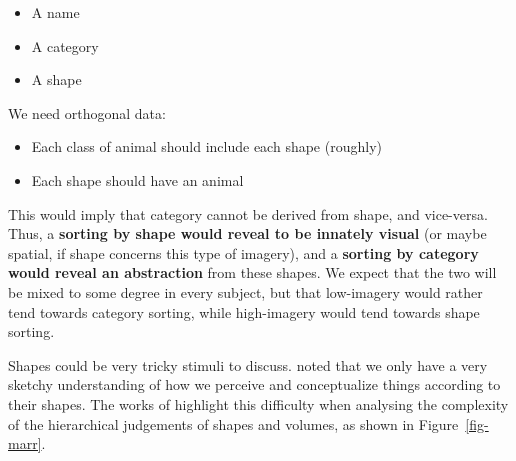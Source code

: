 \documentclass[
  authoryear]{elsarticle}
\begin{document}
\begin{itemize}
\item
  A name
\item
  A category
\item
  A shape
\end{itemize}

We need orthogonal data:

\begin{itemize}
\item
  Each class of animal should include each shape (roughly)
\item
  Each shape should have an animal
\end{itemize}

This would imply that category cannot be derived from shape, and
vice-versa. Thus, a \textbf{sorting by shape would reveal to be innately
visual} (or maybe spatial, if shape concerns this type of imagery), and
a \textbf{sorting by category would reveal an abstraction} from these
shapes. We expect that the two will be mixed to some degree in every
subject, but that low-imagery would rather tend towards category
sorting, while high-imagery would tend towards shape sorting.

Shapes could be very tricky stimuli to discuss. \citet{gardenfors2004}
noted that we only have a very sketchy understanding of how we perceive
and conceptualize things according to their shapes. The works of
\citet{marr1997} highlight this difficulty when analysing the complexity
of the hierarchical judgements of shapes and volumes, as shown in
Figure~\ref{fig-marr}.
\end{document}
